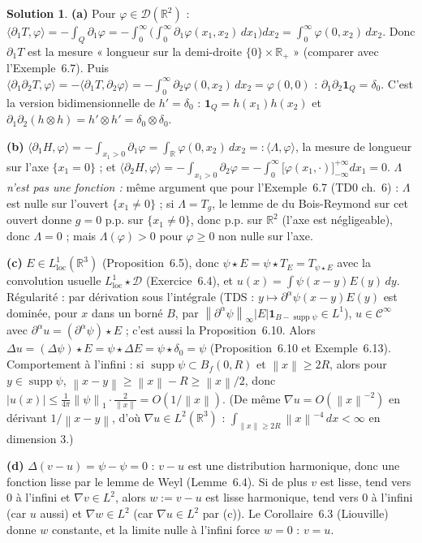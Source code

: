 \documentclass[11pt,a4paper]{article}
\newcommand{\R}{\mathbb{R}}
\newcommand{\Bf}{B_f}
\newcommand{\norm}[1]{\left\|#1\right\|}
\newcommand{\Cinf}{\mathcal{C}^\infty}
\DeclareMathOperator{\supp}{supp}
\newcommand{\D}{\mathcal{D}}
\theoremstyle{definition}
\newtheorem*{solution}{Solution}
\begin{document}
\begin{solution}
\noindent\textbf{(a)} Pour $\varphi\in\D(\R^2)$ : $\langle\partial_1T,\varphi\rangle=-\int_Q\partial_1\varphi=-\int_0^\infty\Big(\int_0^\infty\partial_1\varphi(x_1,x_2)\,dx_1\Big)dx_2=\int_0^\infty\varphi(0,x_2)\,dx_2$. Donc $\partial_1T$ est la mesure « longueur sur la demi-droite $\{0\}\times\R_+$ » (comparer avec l'Exemple~6.7). Puis $\langle\partial_1\partial_2T,\varphi\rangle=-\langle\partial_1T,\partial_2\varphi\rangle=-\int_0^\infty\partial_2\varphi(0,x_2)\,dx_2=\varphi(0,0)$ : $\partial_1\partial_2\mathbf 1_Q=\delta_0$. C'est la version bidimensionnelle de $h'=\delta_0$ : $\mathbf 1_Q=h(x_1)h(x_2)$ et $\partial_1\partial_2(h\otimes h)=h'\otimes h'=\delta_0\otimes\delta_0$.

\medskip
\noindent\textbf{(b)} $\langle\partial_1H,\varphi\rangle=-\int_{x_1>0}\partial_1\varphi=\int_\R\varphi(0,x_2)\,dx_2=:\langle\Lambda,\varphi\rangle$, la mesure de longueur sur l'axe $\{x_1=0\}$ ; et $\langle\partial_2H,\varphi\rangle=-\int_{x_1>0}\partial_2\varphi=-\int_0^\infty\big[\varphi(x_1,\cdot)\big]_{-\infty}^{+\infty}dx_1=0$. \emph{$\Lambda$ n'est pas une fonction :} même argument que pour l'Exemple~6.7 (TD0 ch.~6) : $\Lambda$ est nulle sur l'ouvert $\{x_1\ne0\}$ ; si $\Lambda=T_g$, le lemme de du Bois-Reymond sur cet ouvert donne $g=0$ p.p. sur $\{x_1\ne0\}$, donc p.p. sur $\R^2$ (l'axe est négligeable), donc $\Lambda=0$ ; mais $\Lambda(\varphi)>0$ pour $\varphi\ge0$ non nulle sur l'axe.

\medskip
\noindent\textbf{(c)} $E\in L^1_{\mathrm{loc}}(\R^3)$ (Proposition~6.5), donc $\psi\star E=\psi\star T_E=T_{\psi\star E}$ avec la convolution usuelle $L^1_{\mathrm{loc}}\star\D$ (Exercice~6.4), et $u(x)=\int\psi(x-y)E(y)\,dy$. Régularité : par dérivation sous l'intégrale (TDS : $y\mapsto\partial^\alpha\psi(x-y)E(y)$ est dominée, pour $x$ dans un borné $B$, par $\norm{\partial^\alpha\psi}_\infty|E|\mathbf 1_{B-\supp\psi}\in L^1$), $u\in\Cinf$ avec $\partial^\alpha u=(\partial^\alpha\psi)\star E$ ; c'est aussi la Proposition~6.10. Alors $\Delta u=(\Delta\psi)\star E=\psi\star\Delta E=\psi\star\delta_0=\psi$ (Proposition~6.10 et Exemple~6.13). Comportement à l'infini : si $\supp\psi\subset\Bf(0,R)$ et $\norm x\ge2R$, alors pour $y\in\supp\psi$, $\norm{x-y}\ge\norm x-R\ge\norm x/2$, donc $|u(x)|\le\frac1{4\pi}\norm\psi_1\cdot\frac2{\norm x}=O(1/\norm x)$. (De même $\nabla u=O(\norm x^{-2})$ en dérivant $1/\norm{x-y}$, d'où $\nabla u\in L^2(\R^3)$ : $\int_{\norm x\ge2R}\norm x^{-4}\,dx<\infty$ en dimension $3$.)

\medskip
\noindent\textbf{(d)} $\Delta(v-u)=\psi-\psi=0$ : $v-u$ est une distribution harmonique, donc une fonction lisse par le lemme de Weyl (Lemme~6.4). Si de plus $v$ est lisse, tend vers $0$ à l'infini et $\nabla v\in L^2$, alors $w:=v-u$ est lisse harmonique, tend vers $0$ à l'infini (car $u$ aussi) et $\nabla w\in L^2$ (car $\nabla u\in L^2$ par (c)). Le Corollaire~6.3 (Liouville) donne $w$ constante, et la limite nulle à l'infini force $w=0$ : $v=u$.
\end{solution}
\end{document}
